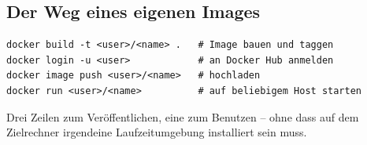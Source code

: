 \subsection{Der Weg eines eigenen Images}
\begin{lstlisting}
docker build -t <user>/<name> .   # Image bauen und taggen
docker login -u <user>            # an Docker Hub anmelden
docker image push <user>/<name>   # hochladen
docker run <user>/<name>          # auf beliebigem Host starten
\end{lstlisting}
Drei Zeilen zum Veröffentlichen, eine zum Benutzen -- ohne dass auf dem
Zielrechner irgendeine Laufzeitumgebung installiert sein muss.
